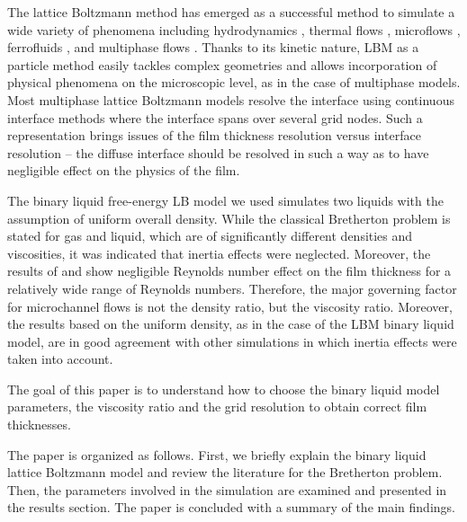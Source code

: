 \documentclass[preprint,12pt]{elsarticle}
\begin{document}
The lattice Boltzmann method has emerged as a successful method to simulate
a wide variety of phenomena including hydrodynamics \cite{yu}, thermal flows
\cite{karlin-minimalmodels}, microflows \cite{ansumali-small-knudsen},
ferrofluids \cite{kuzmin-aniso}, and multiphase flows
\cite{swift,Shan-chen:extended}. Thanks to its kinetic nature, LBM as a particle
method easily tackles complex geometries and allows incorporation of
physical phenomena on the microscopic level, as in the case of multiphase models. Most
multiphase lattice Boltzmann models \cite{swift, Shan-chen:extended} resolve
the interface using continuous interface methods where the interface spans over several grid nodes.
Such a representation
brings issues of the film thickness resolution versus interface
resolution -- the diffuse interface should be resolved in such a way as to have
negligible effect on the physics of the film.

The binary liquid free-energy LB model \cite{swift} we used
simulates two liquids with the assumption of uniform overall
density. While the classical Bretherton problem is stated for gas and liquid, which are of
significantly
different densities and viscosities, it was indicated \cite{bretherton} that inertia effects were
neglected. Moreover, the results of \citet{giavedoni-numerical} and \citet{heil-bretherton} show
negligible Reynolds number effect on the film thickness for a relatively wide range of Reynolds
numbers.
Therefore, the major governing factor for microchannel flows is not the density ratio, but the
viscosity ratio. Moreover, the results based on the uniform density, as in the case of the LBM
binary liquid model, are in good agreement with other simulations
\cite{giavedoni-numerical,heil-bretherton} in which inertia effects were taken into account.

The goal of this paper is to understand how to choose the
binary liquid model parameters, the viscosity ratio and the grid
resolution to obtain correct film thicknesses.

The paper is organized as follows.  First, we briefly
explain the binary liquid lattice Boltzmann model and review the literature
for the Bretherton problem. Then, the parameters involved in the
simulation are examined and presented in the results section. The paper is
concluded with a summary of the main findings.
\end{document}
